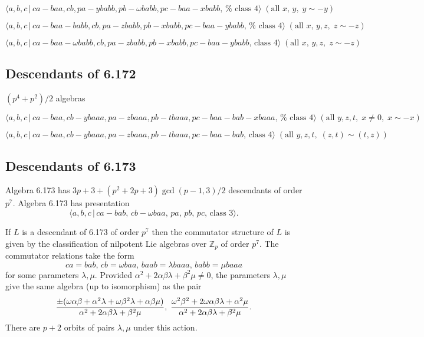 \documentclass[10pt]{article}
\begin{document}
\begin{equation}
\langle a,b,c\,|\,ca-baa,cb,pa-ybabb,pb-\omega babb,pc-baa-xbabb,\,\text{%
class }4\rangle \;(\text{all }x,\,y,\;y\sim -y)  \tag{7.1772}
\end{equation}

\begin{equation}
\langle a,b,c\,|\,ca-baa-babb,cb,pa-zbabb,pb-xbabb,pc-baa-ybabb,\,\text{%
class }4\rangle \;(\text{all }x,\,y,z,\;z\sim -z)  \tag{7.1773}
\end{equation}

\begin{equation}
\langle a,b,c\,|\,ca-baa-\omega babb,cb,pa-zbabb,pb-xbabb,pc-baa-ybabb,\,%
\text{class }4\rangle \;(\text{all }x,\,y,z,\;z\sim -z)  \tag{7.1774}
\end{equation}

\subsection{Descendants of 6.172}

$(p^{4}+p^{2})/2$ algebras

\begin{equation}
\langle a,b,c\,|\,ca-baa,cb-ybaaa,pa-zbaaa,pb-tbaaa,pc-baa-bab-xbaaa,\,\text{%
class }4\rangle \;(\text{all }y,z,t,\;x\neq 0,\;x\sim -x)  \tag{7.1775}
\end{equation}

\begin{equation}
\langle a,b,c\,|\,ca-baa,cb-ybaaa,pa-zbaaa,pb-tbaaa,pc-baa-bab,\,\text{class 
}4\rangle \;(\text{all }y,z,t,\;(z,t)\sim (t,z))  \tag{7.1776}
\end{equation}

\subsection{Descendants of 6.173}

Algebra 6.173 has $3p+3+(p^{2}+2p+3)\gcd (p-1,3)/2$ descendants of order $%
p^{7}$. Algebra 6.173 has presentation 
\[
\langle a,b,c\,|\,ca-bab,\,cb-\omega baa,\,pa,\,pb,\,pc,\,\text{class }%
3\rangle . 
\]

If $L$ is a descendant of 6.173 of order $p^{7}$ then the commutator
structure of $L$ is given by the classification of nilpotent Lie algebras
over $\mathbb{Z}_{p}$ of order $p^{7}$. The commutator relations take the
form 
\[
ca=bab,\,cb=\omega baa,\,baab=\lambda baaa,\,babb=\mu baaa 
\]%
for some parameters $\lambda ,\mu $. Provided $\alpha ^{2}+2\alpha \beta
\lambda +\beta ^{2}\mu \neq 0$, the parameters $\lambda ,\mu $ give the same
algebra (up to isomorphism) as the pair%
\[
\frac{\pm (\omega \alpha \beta +\alpha ^{2}\lambda +\omega \beta ^{2}\lambda
+\alpha \beta \mu )}{\alpha ^{2}+2\alpha \beta \lambda +\beta ^{2}\mu },\;%
\frac{\omega ^{2}\beta ^{2}+2\omega \alpha \beta \lambda +\alpha ^{2}\mu }{%
\alpha ^{2}+2\alpha \beta \lambda +\beta ^{2}\mu }. 
\]%
There are $p+2$ orbits of pairs $\lambda ,\mu $ under this action.
\end{document}
